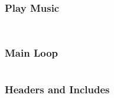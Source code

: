 \subsubsection{Play Music}
\inputminted[fontsize=\small,tabsize=4]{csharp}{scr/PlayMusic.cs}
\newpage
\inputminted[fontsize=\small,tabsize=4]{csharp}{scr/pm2.cs}


\subsubsection{Main Loop}
\inputminted[fontsize=\small,tabsize=4]{csharp}{scr/OnGui.cs}

\subsubsection{Headers and Includes}
\inputminted[fontsize=\small,tabsize=4]{csharp}{scr/Headers.cs}